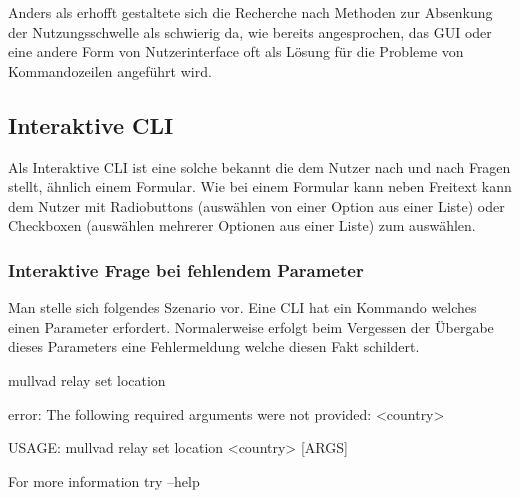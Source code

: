 \documentclass[oneside,bibliography=totocnumbered,BCOR=5mm]{scrbook}
\newenvironment{code}{\captionsetup{type=listing, skip=0pt}}{}
\begin{document}
\newcommand{\methbox}[2]{
  \fbox{\parbox{\linewidth}{
    \label{meth:#1}
    \textbf{Methode~\ref{meth:#1}}: #2
  }}
}
\newcommand{\methref}[1]{
  Methode~\ref{meth:#1}
}

Anders als erhofft gestaltete sich die Recherche nach Methoden zur Absenkung
der Nutzungsschwelle als schwierig da, wie bereits angesprochen, das GUI oder
eine andere Form von Nutzerinterface oft als Lösung für die Probleme von
Kommandozeilen angeführt wird.




\subsection{Interaktive CLI}

Als Interaktive CLI ist eine solche bekannt die dem Nutzer nach und nach Fragen
stellt, ähnlich einem Formular. Wie bei einem Formular kann neben Freitext kann
dem Nutzer mit Radiobuttons (auswählen von einer Option aus einer Liste) oder
Checkboxen (auswählen mehrerer Optionen aus einer Liste) zum auswählen. %



\subsubsection{Interaktive Frage bei fehlendem Parameter}

Man stelle sich folgendes Szenario vor. Eine CLI hat ein Kommando welches einen Parameter erfordert.
Normalerweise erfolgt beim Vergessen der Übergabe dieses Parameters eine Fehlermeldung welche diesen Fakt schildert.

\begin{code}
  \begin{shellcode}
mullvad relay set location

error: The following required arguments were not provided:
    <country>

USAGE:
    mullvad relay set location <country> [ARGS]

For more information try --help
  \end{shellcode}
  \medskip
\end{code}
\end{document}
